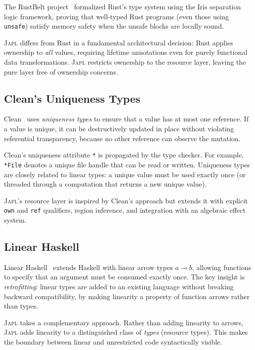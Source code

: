 \documentclass[11pt]{article}
\newcommand{\JAPL}{\textsc{Japl}}
\newcommand{\lolli}{\multimap}
\begin{document}
The RustBelt project~\cite{jung2017rustbelt} formalized Rust's type
system using the Iris separation logic framework, proving that
well-typed Rust programs (even those using \texttt{unsafe}) satisfy
memory safety when the unsafe blocks are locally sound.

\JAPL{} differs from Rust in a fundamental architectural decision:
Rust applies ownership to \emph{all} values, requiring lifetime
annotations even for purely functional data transformations.  \JAPL{}
restricts ownership to the resource layer, leaving the pure layer
free of ownership concerns.

\subsection{Clean's Uniqueness Types}\label{sec:bg-clean}

Clean~\cite{barendsen1996uniqueness,plasmeijer2001clean} uses
\emph{uniqueness types} to ensure that a value has at most one
reference.  If a value is unique, it can be destructively updated
in place without violating referential transparency, because no
other reference can observe the mutation.

Clean's uniqueness attribute \texttt{*} is propagated by the type
checker.  For example, \texttt{*File} denotes a unique file handle
that can be read or written.  Uniqueness types are closely related to
linear types: a unique value must be used exactly once (or
threaded through a computation that returns a new unique value).

\JAPL{}'s resource layer is inspired by Clean's approach but extends
it with explicit \texttt{own} and \texttt{ref} qualifiers, region
inference, and integration with an algebraic effect system.

\subsection{Linear Haskell}\label{sec:bg-linear-haskell}

Linear Haskell~\cite{bernardy2018linear} extends Haskell with linear
arrow types $a \lolli b$, allowing functions to specify that an
argument must be consumed exactly once.  The key insight is
\emph{retrofitting}: linear types are added to an existing language
without breaking backward compatibility, by making linearity a
property of function arrows rather than types.

\JAPL{} takes a complementary approach.  Rather than adding linearity
to arrows, \JAPL{} adds linearity to a distinguished class of
\emph{types} (resource types).  This makes the boundary between linear
and unrestricted code syntactically visible.
\end{document}
